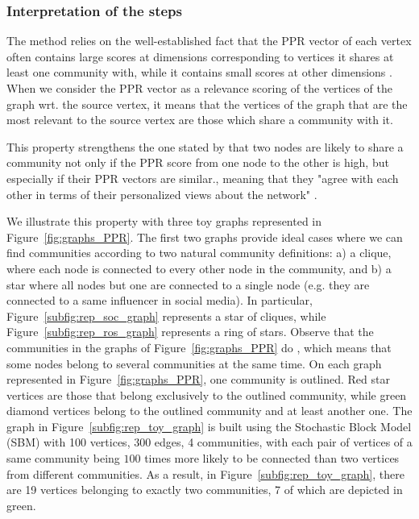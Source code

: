\subsubsection{Interpretation of the steps}\label{subsec:interpretation}


The \parfaite{} method relies on the well-established fact that the PPR vector of each vertex often contains large scores at dimensions corresponding to vertices it shares at least one community with, while it contains small scores at other dimensions \cite{Hollocou2017,Kloumann2014}. When we consider the PPR vector as a relevance scoring of the vertices of the graph wrt. the source vertex, it means that the vertices of the graph that are the most relevant to the source vertex are those which share a community with it.

This property strengthens the one stated by \cite{zhang_2020} that two nodes are likely to share a community not only if the PPR score from one node to the other is high, but especially if their PPR vectors are similar., meaning that they "agree with each other in terms of their personalized views about the network" \cite{zhang_2020}.


We illustrate this property with three toy graphs represented in Figure~\ref{fig:graphs_PPR}. The first two graphs provide ideal cases where we can find communities according to two natural community definitions: a) a clique, where each node is connected to every other node in the community,
and b) a star where all nodes but one are connected to a single node (e.g. they are connected to a same influencer in social media). In particular, Figure~\ref{subfig:rep_soc_graph} represents a star of cliques, while Figure~\ref{subfig:rep_ros_graph} represents a ring of stars. Observe that the communities in the graphs of Figure~\ref{fig:graphs_PPR} do , which means that some nodes belong to several communities at the same time. On each graph represented in Figure~\ref{fig:graphs_PPR}, one community is outlined. Red star vertices are those that belong exclusively to the outlined community, while green diamond vertices belong to the outlined community and at least another one. The graph in Figure~\ref{subfig:rep_toy_graph} is built using the Stochastic Block Model (SBM) with 100 vertices, 300 edges, 4 communities, with each pair of vertices of a same community being $100$ times more likely to be connected than two vertices from different communities. As a result, in Figure~\ref{subfig:rep_toy_graph}, there are 19 vertices belonging to exactly two communities, 7 of which are depicted in green. 

